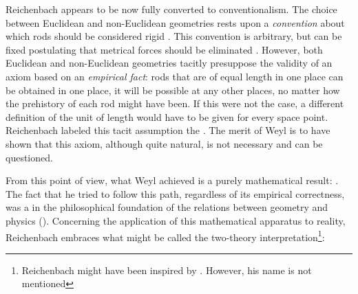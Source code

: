 \documentclass[draft]{article}
\begin{document}
Reichenbach appears to be now fully converted to conventionalism. The choice between Euclidean and non-Euclidean geometries rests upon a \emph{convention} about which rods should be considered rigid \citep[366]{Reichenbach1922a}. This convention is arbitrary, but can be fixed postulating that metrical forces should be eliminated \citep{Reichenbach1922}. However, both Euclidean and non-Euclidean geometries tacitly presuppose the validity of an axiom based on an \emph{empirical fact}: rods that are of equal length in one place can be obtained in one place, it will be possible at any other places, no matter how the prehistory of each rod might have been. If this were not the case, a different definition of the unit of length would have to be given for every space point. Reichenbach labeled this tacit assumption the  \citep[366]{Reichenbach1922a}. The merit of Weyl is to have shown that this axiom, although quite natural, is not necessary and can be questioned. 

From this point of view, what Weyl achieved is a purely mathematical result:  \citep[365]{Reichenbach1922a}. The fact that he tried to follow this path, regardless of its empirical correctness, was a  in the philosophical foundation of the relations between geometry and physics (\citealp[367f.]{Reichenbach1921}). Concerning the application of this mathematical apparatus to reality, Reichenbach embraces what might be called the two-theory interpretation\footnote{Reichenbach might have been inspired by \citet{Pauli1921}. However, his name is not mentioned}:
\end{document}
